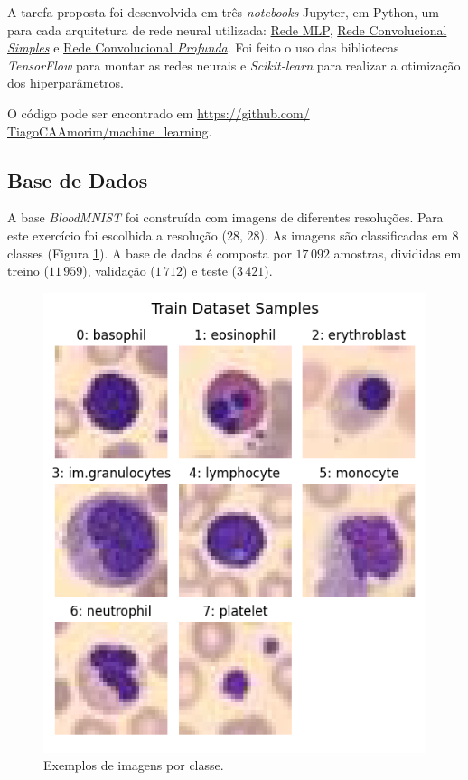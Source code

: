 \documentclass[final,5p]{elsarticle}
\numberwithin{equation}{section}
\begin{document}
    A tarefa proposta foi desenvolvida em três \emph{notebooks} Jupyter, em Python, um para cada arquitetura de rede neural utilizada: \href{https://github.com/TiagoCAAmorim/machine_learning/blob/main/Lista03/Lista03_MLP.ipynb}{Rede MLP}, \href{https://github.com/TiagoCAAmorim/machine_learning/blob/main/Lista03/Lista03_SimpleCNN.ipynb}{Rede Convolucional \emph{Simples}} e \href{https://github.com/TiagoCAAmorim/machine_learning/blob/main/Lista03/Lista03_ResNet.ipynb}{Rede Convolucional \emph{Profunda}}. Foi feito o uso das bibliotecas \emph{TensorFlow} \cite{tensorflow2015-whitepaper} para montar as redes neurais e \emph{Scikit-learn} \cite{scikit-learn} para realizar a otimização dos hiperparâmetros.

    O código pode ser encontrado em \href{https://github.com/TiagoCAAmorim/machine_learning/blob/main/Lista03}{https://github.com/ TiagoCAAmorim/machine\_learning}.

    \subsection{Base de Dados}

    A base \emph{BloodMNIST} foi construída com imagens de diferentes resoluções. Para este exercício foi escolhida a resolução (28, 28). As imagens são classificadas em 8 classes (Figura \ref{fig:AmostrasPainel}). A base de dados é composta por $17\,092$ amostras, divididas em treino ($11\,959$), validação ($1\,712$) e teste ($3\,421$).

    \begin{figure}[hbt!]
        \includegraphics[width=0.95\columnwidth]{Samples_panel.png}
        \caption{Exemplos de imagens por classe.}\label{fig:AmostrasPainel}
    \end{figure}
\end{document}
